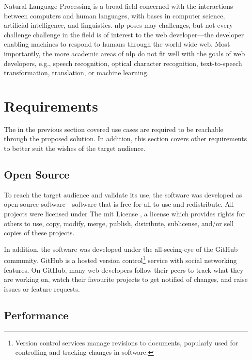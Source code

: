 Natural Language Processing is a broad field concerned with the
interactions between computers and human languages, with bases in
computer science, artificial intelligence, and linguistics. \gls{nlp}
poses may challenges, but not every challenge challenge in the field is
of interest to the web developer---the developer enabling machines to
respond to humans through the world wide web. Most importantly, the more
academic areas of \gls{nlp} do not fit well with the goals of web
developers, e.g., speech recognition, optical character recognition,
text-to-speech transformation, translation, or machine learning.

\section{Requirements}\label{requirements}

The in the previous section covered use cases are required to be
reachable through the proposed solution. In addition, this section
covers other requirements to better suit the wishes of the target
audience.

\subsection{Open Source}\label{open-source}

To reach the target audience and validate its use, the software was
developed as open source software---software that is free for all to use
and redistribute. All projects were licensed under The \acrshort{mit}
License \autocite{opensource.org-licenses-mit}, a license which provides
rights for others to use, copy, modify, merge, publish, distribute,
sublicense, and/or sell copies of these projects.

In addition, the software was developed under the all-seeing-eye of the
GitHub community. GitHub is a hosted version control\footnote{Version
  control services manage revisions to documents, popularly used for
  controlling and tracking changes in software.} service with social
networking features. On GitHub, many web developers follow their peers
to track what they are working on, watch their favourite projects to get
notified of changes, and raise issues or feature requests.

\subsection{Performance}\label{performance}

